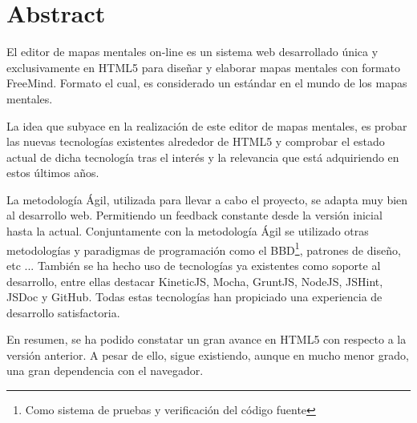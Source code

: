 \newpage\mbox{}\thispagestyle{empty}

\chapter{Abstract}

El editor de mapas mentales on-line es un sistema web desarrollado única y exclusivamente en HTML5
para diseñar y elaborar mapas mentales con formato FreeMind. Formato el cual, es considerado un
estándar en el mundo de los mapas mentales.

La idea que subyace en la realización de este editor de mapas mentales, es probar las nuevas
tecnologías existentes alrededor de HTML5 y comprobar el estado actual de dicha
tecnología tras el interés y la relevancia que está adquiriendo en estos últimos años. 

La metodología Ágil, utilizada para llevar a cabo el proyecto, se adapta muy bien al desarrollo web. Permitiendo un feedback constante desde la versión inicial hasta la actual. Conjuntamente con la metodología Ágil se utilizado otras metodologías y paradigmas de programación como el BBD\footnote{Como sistema de pruebas y verificación del código fuente}, patrones de diseño, etc ... También se ha hecho uso de tecnologías ya existentes como soporte al desarrollo, entre ellas destacar KineticJS, Mocha, GruntJS, NodeJS, JSHint, JSDoc y GitHub. Todas estas tecnologías han propiciado una experiencia de desarrollo satisfactoria. 

En resumen, se ha podido constatar un gran avance en HTML5 con respecto a la versión anterior. A pesar de ello, sigue existiendo, aunque en mucho menor grado, una gran dependencia con el navegador. 
